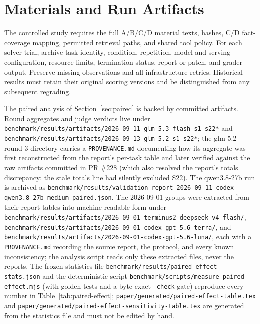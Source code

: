 \documentclass[11pt]{article}
\begin{document}
\section{Materials and Run Artifacts}
\label{app:generic}
\label{app:raw}
The controlled study requires the full A/B/C/D material texts, hashes, C/D fact-coverage mapping, permitted retrieval paths, and shared tool policy.
For each solver trial, archive task identity, condition, repetition, model and serving configuration, resource limits, termination status, report or patch, and grader output.
Preserve missing observations and all infrastructure retries.
Historical results must retain their original scoring versions and be distinguished from any subsequent regrading.

The paired analysis of Section~\ref{sec:paired} is backed by committed artifacts.
Round aggregates and judge verdicts live under \texttt{benchmark/results/artifacts/2026-09-11-glm-5.3-flash-s1-s22*} and \texttt{benchmark/results/artifacts/2026-09-13-glm-5.2-s1-s22*}; the glm-5.2 round-3 directory carries a \texttt{PROVENANCE.md} documenting how its aggregate was first reconstructed from the report's per-task table and later verified against the raw artifacts committed in PR \#228 (which also resolved the report's totals discrepancy: the stale totals line had silently excluded S22).
The qwen3.8-27b run is archived as \texttt{benchmark/results/validation-report-2026-09-11-codex-qwen3.8-27b-medium-paired.json}.
The 2026-09-01 groups were extracted from their report tables into machine-readable form under \texttt{benchmark/results/artifacts/2026-09-01-terminus2-deepseek-v4-flash/}, \texttt{benchmark/results/artifacts/2026-09-01-codex-gpt-5.6-terra/}, and \texttt{benchmark/results/artifacts/2026-09-01-codex-gpt-5.6-luna/}, each with a \texttt{PROVENANCE.md} recording the source report, the protocol, and every known inconsistency; the analysis script reads only these extracted files, never the reports.
The frozen statistics file \texttt{benchmark/results/paired-effect-stats.json} and the deterministic script \texttt{benchmark/scripts/measure-paired-effect.mjs} (with golden tests and a byte-exact \texttt{--check} gate) reproduce every number in Table~\ref{tab:paired-effect}; \texttt{paper/generated/paired-effect-table.tex} and \texttt{paper/generated/paired-effect-sensitivity-table.tex} are generated from the statistics file and must not be edited by hand.
\end{document}
